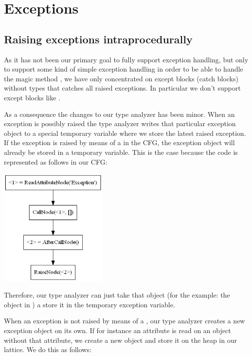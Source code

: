 \chapter{Exceptions}
\label{chapter:Exceptions}
\section{Raising exceptions intraprocedurally}
As it has not been our primary goal to fully support exception handling, but only to support some kind of simple exception handling in order to be able to handle the magic method , we have only concentrated on except blocks (catch blocks) without types that catches all raised exceptions. In particular we don't support except blocks like .

As a consequence the changes to our type analyzer has been minor. When an exception is possibly raised the type analyzer writes that particular exception object to a special temporary variable where we store the latest raised exception. If the exception is raised by means of a  in the CFG, the exception object will already be stored in a temporary variable. This is the case because the code  is represented as follows in our CFG:

\begin{listing}[H]
	\begin{center}
		\includegraphics[width=0.4\textwidth]{images/raiseexception.png}
	\end{center}
	\vspace{-20pt}
\end{listing}

Therefore, our type analyzer can just take that object (for the example: the object in ) a store it in the temporary exception variable.

When an exception is not raised by means of a , our type analyzer creates a new exception object on its own. If for instance an attribute is read on an object without that attribute, we create a new  object and store it on the heap in our lattice. We do this as follows:

